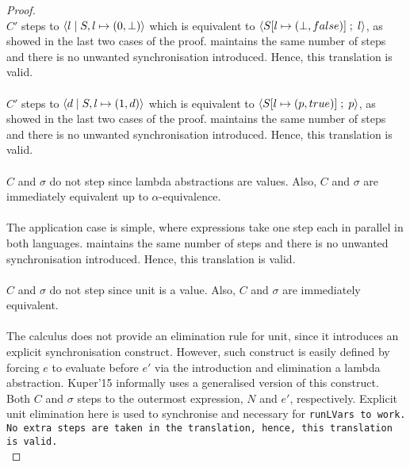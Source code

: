 \documentclass[main.tex]{subfiles}
\begin{document}
\begin{proof}
  \\
  $C'$ steps to $\langle {l}\;\vert\;{S, l \mapsto (0, \bot)} \rangle$ which
  is equivalent to $\langle {S[l \mapsto (\bot, false)]} \; ; \;{l} \rangle$, as showed in the last two
  cases of the proof. \typedlvar maintains the same number of steps and there is
  no unwanted synchronisation introduced. Hence, this translation is valid.  \\

  \\
  $C'$ steps to $\langle {d}\;\vert\;{S, l \mapsto (1, d)} \rangle$ which
  is equivalent to $\langle {S[l \mapsto (p, true)]} \; ; \;{p} \rangle$, as showed in the last two
  cases of the proof. \typedlvar maintains the same number of steps and there is
  no unwanted synchronisation introduced. Hence, this translation is valid. \\


  \\
  $C$ and $\sigma$ do not step since lambda abstractions are values. Also, $C$
  and $\sigma$ are immediately equivalent up to $\alpha$-equivalence.\\


  \\
  The application case is simple, where expressions take one step each in
  parallel in both languages. \typedlvar maintains the same number of steps and
  there is no unwanted synchronisation introduced. Hence, this translation is
  valid. \\


  \\
  $C$ and $\sigma$ do not step since unit is a value. Also, $C$
  and $\sigma$ are immediately equivalent.\\


  \\
  The \lvar calculus does not provide an elimination rule for unit, since it
  introduces an explicit synchronisation construct. However, such construct is
  easily defined by forcing $e$ to evaluate before $e'$ via the introduction and
  elimination a lambda abstraction. Kuper'15 informally uses a generalised
  version of this construct. Both $C$ and $\sigma$ steps to the outermost
  expression, $N$ and $e'$, respectively. Explicit unit elimination here is used
  to synchronise and necessary for \tt{runLVars} to work. No extra steps are
  taken in the translation, hence, this translation is valid.\\


\end{proof}
\end{document}

